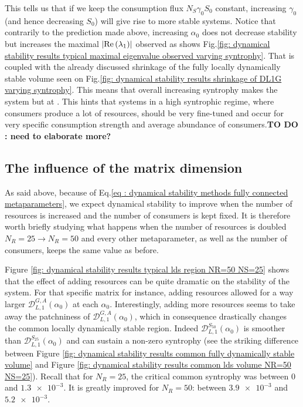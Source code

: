 \documentclass[12pt, titlepage]{report}
\begin{document}
This tells us that if we keep the consumption flux $N_S \gamma_0 S_0$ constant, increasing $\gamma_0$ (and hence decreasing $S_0$) will give rise to more stable systems. Notice that contrarily to the prediction made above, increasing $\alpha_0$ does not decrease stability but increases the maximal $\left|{\text{Re}\left(\lambda_1\right)}\right|$ observed as shows Fig.\ref{fig: dynamical stability results typical maximal eigenvalue observed varying syntrophy}. That is coupled with the already discussed shrinkage of the fully locally dynamically stable volume seen on Fig.\ref{fig: dynamical stability results shrinkage of DL1G varying syntrophy}. This means that overall increasing syntrophy makes the system  but at . This hints that systems in a high syntrophic regime, where consumers produce a lot of resources, should be very fine-tuned and occur for very specific consumption strength and average abundance of consumers.\textbf{TO DO : need to elaborate more?}


\subsection{The influence of the matrix dimension}
As said above, because of Eq.\eqref{eq : dynamical stability methods fully connected metaparameters}, we expect dynamical stability to improve when the number of resources is increased and the number of consumers is kept fixed. It is therefore worth briefly studying what happens when the number of resources is doubled $N_R=25 \rightarrow N_R=50$ and every other metaparameter, as well as the number of consumers, keeps the same value as before.

Figure \ref{fig: dynamical stability results typical lds region NR=50 NS=25} shows that the effect of adding resources can be quite dramatic on the stability of the system. For that specific matrix for instance, adding resources allowed for a way larger $\mathcal{D}^{G,A}_{L,1}\left(\alpha_0\right)$ at each $\alpha_0$. Interestingly, adding more resources seems to take away the patchniness of $\mathcal{D}_{L,1}^{G,A}(\alpha_0)$, which in consequence drastically changes the {common locally dynamically stable} region. Indeed $\mathcal{D}_{L,1}^{S_{50}}(\alpha_0)$ is smoother than $\mathcal{D}_{L,1}^{S_{25}}(\alpha_0)$ and can sustain a non-zero syntrophy (see the striking difference between Figure \ref{fig: dynamical stability results common fully dynamically stable volume} and Figure \ref{fig: dynamical stability results common lds volume NR=50 NS=25}). Recall that  for $N_R=25$, the critical common syntrophy was between $0$ and $\num{1.3e-3}$. It is greatly improved for $N_R=50$: between $\num{3.9e-3}$ and $\num{5.2e-3}$.
\end{document}
